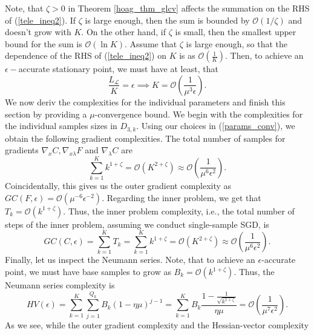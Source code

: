\documentclass[11pt, twoside]{report}
\begin{document}
Note, that $\zeta>0$ in Theorem \ref{hoag_thm_glcv} affects the summation on the RHS of (\ref{tele_ineq2}). If $\zeta$ is large enough, then the sum is bounded by $\mathcal{O}(1/\zeta)$ and doesn't grow with $K$. On the other hand, if $\zeta$ is small, then the smallest upper bound for the sum is $\mathcal{O}(\ln{K})$. Assume that $\zeta$ is large enough, so that the dependence of the RHS of (\ref{tele_ineq2}) on $K$ is as $\mathcal{O}\left( \frac{1}{K} \right)$. Then, to achieve an $\epsilon-$accurate stationary point, we must have at least, that
\[\frac{L_\mathcal{L}}{K} = \epsilon \implies K = \mathcal{O}\left(\frac{1}{\mu^3 \epsilon} \right).\]
We now deriv the complexities for the individual parameters and finish this section by providing a $\mu$-convergence bound. We begin with the complexities for the individual samples sizes in $D_{3,k}$. Using our choices in (\ref{params_conv}), we obtain the following gradient complexities. The total number of samples for gradients $\nabla_{x}C, \nabla_{x\lambda} F$ and $\nabla_\lambda C$ are
\[\sum_{k=1}^K k^{1+\zeta} = \mathcal{O} \left(K^{2+\zeta} \right) \approx \mathcal{O}\left(\frac{1}{\mu^6\epsilon^2}\right).\]
Coincidentally, this gives us the outer gradient complexity as $GC(F,\epsilon) = \mathcal{O}(\mu^{-6}\epsilon^{-2})$.
Regarding the inner problem, we get that $T_k = \mathcal{O}\left(k^{1+\zeta}\right)$. Thus, the inner problem complexity, i.e., the total number of steps of the inner problem, assuming we conduct single-sample SGD, is
\[GC(C,\epsilon) = \sum_{k=1}^K T_k = \sum_{k=1}^{K} k^{1+\zeta} = \mathcal{O}(K^{2+\zeta}) \approx \mathcal{O} \left(\frac{1}{\mu^6 \epsilon^2}\right).\]
Finally, let us inspect the Neumann series. Note, that to achieve an $\epsilon$-accurate point, we must have base samples to grow as $B_k = \mathcal{O} \left( k^{1+\zeta} \right)$. Thus, the Neumann series complexity is
\[HV(\epsilon) = \sum_{k=1}^K \sum_{j=1}^{Q_k} B_k (1-\eta\mu)^{j-1}=\sum_{k=1}^K B_k \frac{1 - \frac{1}{\sqrt{k^{1+\zeta}}}}{\eta\mu} = \mathcal{O}\left(\frac{1}{\mu^7 \epsilon^2} \right).\]
As we see, while the outer gradient complexity and the Hessian-vector complexity
\end{document}
